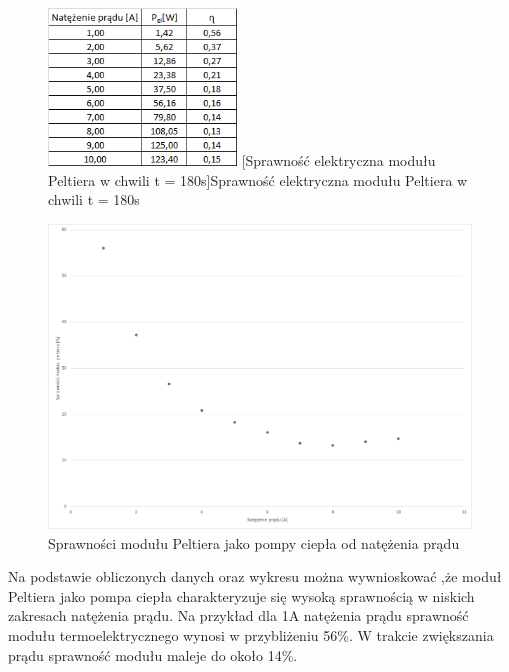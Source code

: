 \documentclass[oneside]{mgr}
\begin{document}
\begin{center}
\begin{figure}[h!]
    \centering
    \includegraphics[width=5cm]{Spr_dane.png}
    [Sprawność elektryczna modułu Peltiera w chwili t = 180s]{Sprawność elektryczna modułu Peltiera w chwili t = 180s}
    \end{figure}
\end{center}

\begin{center}
\begin{figure}[h!]
    \centering
    \includegraphics[width=\textwidth]{Spr_wykres.png}
    \caption{Sprawności modułu Peltiera jako pompy ciepła od natężenia prądu}
    \end{figure}
\end{center}
Na podstawie obliczonych danych oraz wykresu można wywnioskować ,że moduł Peltiera jako pompa ciepła charakteryzuje się wysoką sprawnością w niskich zakresach natężenia prądu. Na przykład dla 1A natężenia prądu sprawność modułu termoelektrycznego wynosi w przybliżeniu 56\%. W trakcie zwiększania prądu sprawność modułu maleje do około 14\%.
\end{document}
